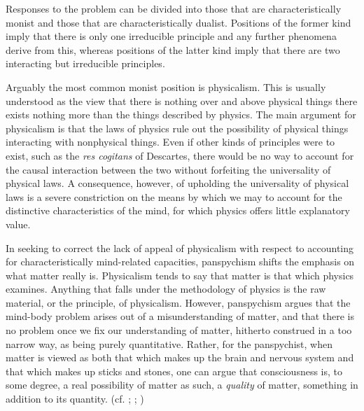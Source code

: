 Responses to the problem can be divided into those that are characteristically monist and those that are characteristically dualist. Positions of the former kind imply that there is only one irreducible principle and any further phenomena derive from this, whereas positions of the latter kind imply that there are two interacting but irreducible principles.

Arguably the most common monist position is physicalism. This is usually understood as the view that there is nothing over and above physical things {\textemdash} there exists nothing more than the things described by physics.
\parencite[][]{Papineau2001-PAPTRO}
The main argument for physicalism is that the laws of physics rule out the possibility of physical things interacting with nonphysical things.
Even if other kinds of principles were to exist, such as the \emph{res cogitans} of Descartes, there would be no way to account for the causal interaction between the two without forfeiting the universality of physical laws. A consequence, however, of upholding the universality of physical laws is a severe constriction on the means by which we may to account for the distinctive characteristics of the mind, for which physics offers little explanatory value.

In seeking to correct the lack of appeal of physicalism with respect to accounting for characteristically mind-related capacities, panspychism shifts the emphasis on what matter really is. Physicalism tends to say that matter is that which physics examines. Anything that falls under the methodology of physics is the raw material, or the principle, of physicalism. However, panspychism argues that the mind-body problem arises out of a misunderstanding of matter, and that there is no problem once we fix our understanding of matter, hitherto construed in a too narrow way, as being purely quantitative. Rather, for the panspychist, when matter is viewed as both that which makes up the brain and nervous system and that which makes up sticks and stones, one can argue that consciousness is, to some degree, a real possibility of matter as such, a \emph{quality} of matter, something in addition to its quantity.
(cf. \cite[][]{goff2019galileo}; \cite[][]{Chalmers2013-CHAPAP-17}; \cite[][]{Strawson2006-STRRM-2})

